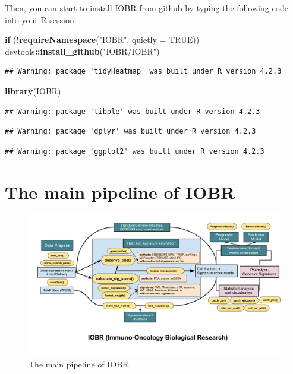 \documentclass[
  12pt,
]{book}
\newenvironment{Shaded}{\begin{snugshade}}{\end{snugshade}}
\newcommand{\AttributeTok}[1]{\textcolor[rgb]{0.13,0.29,0.53}{#1}}
\newcommand{\ConstantTok}[1]{\textcolor[rgb]{0.56,0.35,0.01}{#1}}
\newcommand{\ControlFlowTok}[1]{\textcolor[rgb]{0.13,0.29,0.53}{\textbf{#1}}}
\newcommand{\FunctionTok}[1]{\textcolor[rgb]{0.13,0.29,0.53}{\textbf{#1}}}
\newcommand{\NormalTok}[1]{#1}
\newcommand{\SpecialCharTok}[1]{\textcolor[rgb]{0.81,0.36,0.00}{\textbf{#1}}}
\newcommand{\StringTok}[1]{\textcolor[rgb]{0.31,0.60,0.02}{#1}}
\theoremstyle{definition}
\theoremstyle{definition}
\theoremstyle{definition}
\theoremstyle{definition}
\theoremstyle{remark}
\begin{document}
Then, you can start to install IOBR from github by typing the following code into your R session:

\begin{Shaded}
\begin{Highlighting}[]
\ControlFlowTok{if}\NormalTok{ (}\SpecialCharTok{!}\FunctionTok{requireNamespace}\NormalTok{(}\StringTok{"IOBR"}\NormalTok{, }\AttributeTok{quietly =} \ConstantTok{TRUE}\NormalTok{))  devtools}\SpecialCharTok{::}\FunctionTok{install\_github}\NormalTok{(}\StringTok{"IOBR/IOBR"}\NormalTok{)}
\end{Highlighting}
\end{Shaded}

\begin{verbatim}
## Warning: package 'tidyHeatmap' was built under R version 4.2.3
\end{verbatim}

\begin{Shaded}
\begin{Highlighting}[]
\FunctionTok{library}\NormalTok{(IOBR)}
\end{Highlighting}
\end{Shaded}

\begin{verbatim}
## Warning: package 'tibble' was built under R version 4.2.3
\end{verbatim}

\begin{verbatim}
## Warning: package 'dplyr' was built under R version 4.2.3
\end{verbatim}

\begin{verbatim}
## Warning: package 'ggplot2' was built under R version 4.2.3
\end{verbatim}

\hypertarget{the-main-pipeline-of-iobr}{%
\section{The main pipeline of IOBR}\label{the-main-pipeline-of-iobr}}

\begin{figure}

{\centering \includegraphics[width=92.42in]{./fig/IOBR-Package} 

}

\caption{The main pipeline of IOBR}\label{fig:flowchart}
\end{figure}
\end{document}
